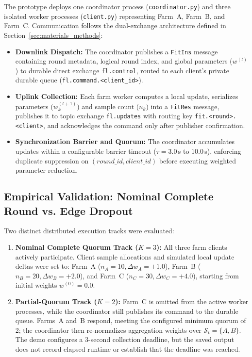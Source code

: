 \documentclass[applsci,article,submit,oneauthor,pdftex]{Definitions/mdpi}
\begin{document}
The prototype deploys one coordinator process (\texttt{coordinator.py}) and three isolated worker processes (\texttt{client.py}) representing Farm~A, Farm~B, and Farm~C. Communication follows the dual-exchange architecture defined in Section~\ref{sec:materials_methods}:
\begin{itemize}[leftmargin=*]
    \item \textbf{Downlink Dispatch:} The coordinator publishes a \texttt{FitIns} message containing round metadata, logical round index, and global parameters ($w^{(t)}$) to durable direct exchange \texttt{fl.control}, routed to each client's private durable queue (\texttt{fl.command.<client\_id>}).
    \item \textbf{Uplink Collection:} Each farm worker computes a local update, serializes parameters ($w_k^{(t+1)}$) and sample count ($n_k$) into a \texttt{FitRes} message, publishes it to topic exchange \texttt{fl.updates} with routing key \texttt{fit.<round>.<client>}, and acknowledges the command only after publisher confirmation.
    \item \textbf{Synchronization Barrier and Quorum:} The coordinator accumulates updates within a configurable barrier timeout ($\tau = 3.0$\,s to $10.0$\,s), enforcing duplicate suppression on $(round\_id, client\_id)$ before executing weighted parameter reduction.
\end{itemize}

\subsection{Empirical Validation: Nominal Complete Round vs. Edge Dropout}
Two distinct distributed execution tracks were evaluated:
\begin{enumerate}[leftmargin=*]
    \item \textbf{Nominal Complete Quorum Track ($K=3$):} All three farm clients actively participate. Client sample allocations and simulated local update deltas were set to: Farm~A ($n_A = 10, \Delta w_A = +1.0$), Farm~B ($n_B = 20, \Delta w_B = +2.0$), and Farm~C ($n_C = 30, \Delta w_C = +4.0$), starting from initial weights $w^{(0)} = 0.0$.
    \item \textbf{Partial-Quorum Track ($K=2$):} Farm~C is omitted from the active worker processes, while the coordinator still publishes its command to the durable queue. Farms~A and~B respond, meeting the configured minimum quorum of 2; the coordinator then re-normalizes aggregation weights over $\mathcal{S}_t = \{A, B\}$. The demo configures a 3-second collection deadline, but the saved output does not record elapsed runtime or establish that the deadline was reached.
\end{enumerate}
\end{document}
